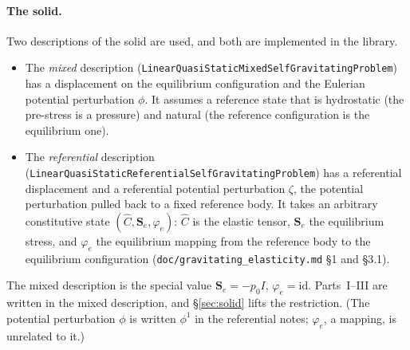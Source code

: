 \documentclass[11pt]{article}
\theoremstyle{definition}
\theoremstyle{remark}
\newcommand{\code}[1]{\texttt{#1}}
\newcommand{\Se}{\mathbf{S}_e}
\begin{document}
\paragraph{The solid.} Two descriptions of the solid are used, and
both are implemented in the library.
\begin{itemize}
\item The \emph{mixed} description
  (\code{LinearQuasiStaticMixedSelfGravitatingProblem}) has a
  displacement on the equilibrium configuration and the Eulerian
  potential perturbation $\phi$. It assumes a reference state that is
  hydrostatic (the pre-stress is a pressure) and natural (the
  reference configuration is the equilibrium one).
\item The \emph{referential} description
  (\code{LinearQuasiStaticReferentialSelfGravitatingProblem}) has a
  referential displacement and a referential potential perturbation
  $\zeta$, the potential perturbation pulled back to a fixed reference
  body. It takes an arbitrary constitutive state $(\hat C, \Se,
  \varphi_e)$: $\hat C$ is the elastic tensor, $\Se$ the equilibrium
  stress, and $\varphi_e$ the equilibrium mapping from the reference
  body to the equilibrium configuration
  (\code{doc/gravitating\_elasticity.md} \S1 and \S3.1).
\end{itemize}
The mixed description is the special value $\Se = -p_0 I$, $\varphi_e
= \mathrm{id}$. Parts~I--III are written in the mixed description, and
\S\ref{sec:solid} lifts the restriction. (The potential perturbation
$\phi$ is written $\phi^1$ in the referential notes; $\varphi_e$, a
mapping, is unrelated to it.)
\end{document}
